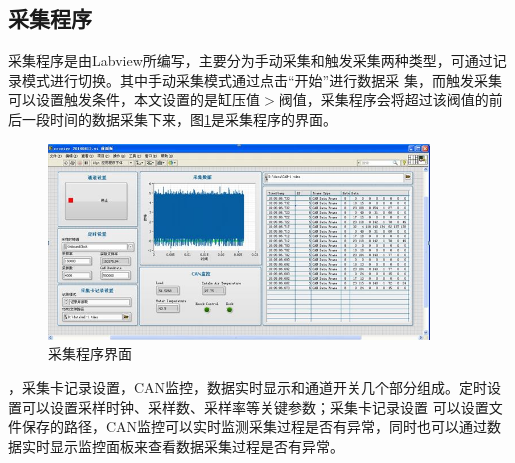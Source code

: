\subsection{采集程序}
采集程序是由Labview所编写，主要分为手动采集和触发采集两种类型，可通过记录模式进行切换。其中手动采集模式通过点击“开始”进行数据采
集，而触发采集可以设置触发条件，本文设置的是缸压值$>$阀值，采集程序会将超过该阀值的前后一段时间的数据采集下来，图\ref{fig:cjcxjm}是采集程序的界面。
\begin{figure}[!ht]
	\centering
	\includegraphics[width=0.9\textwidth]{thesis_figure/platformer_chapter/cjcxjm}
	\caption{采集程序界面}
	\label{fig:cjcxjm}
\end{figure}
，采集卡记录设置，CAN监控，数据实时显示和通道开关几个部分组成。定时设置可以设置采样时钟、采样数、采样率等关键参数；采集卡记录设置
可以设置文件保存的路径，CAN监控可以实时监测采集过程是否有异常，同时也可以通过数据实时显示监控面板来查看数据采集过程是否有异常。





